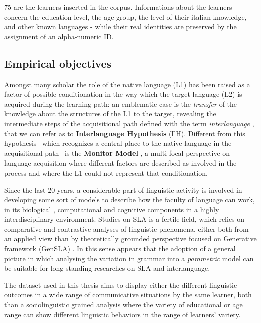 \documentclass[a4paper,twoside,12pt,chapterprefix=false,bibliography=totocnumbered,listof=flat]{scrbook}
\begin{document}
75 are the learners inserted in the corpus. Informations about the
learners concern the education level, the age group, the level of their
italian knowledge, and other known languages - while their real
identities are preserved by the assignment of an alpha-numeric ID.

\subsection{Empirical objectives}\label{empirical-objectives}

Amongst many scholar the role of the native language (L1) has been
raised as a factor of possible conditionation in the way which the
target language (L2) is acquired during the learning path: an emblematic
case is the \emph{transfer} of the knowledge about the structures of the
L1 to the target, revealing the intermediate steps of the acquisitional
path defined with the term \emph{interlanguage} \citep{selinker1972},
that we can refer as to \textbf{Interlanguage Hypothesis} (IlH).
Different from this hypothesis --which recognizes a central place to the
native language in the acquisitional path-- is the \textbf{Monitor
Model} \citep{krashen1981}, a multi-focal perspective on language
acquisition where different factors are described as involved in the
process and where the L1 could not represent that conditionation.

Since the last 20 years, a considerable part of linguistic activity is
involved in developing some sort of models to describe how the faculty
of language can work, in its biological \citep{hcf2002}, computational
\citep{fodor2001} and cognitive components in a highly interdisciplinary
environment. Studies on SLA is a fertile field, which relies on
comparative and contrastive analyses of linguistic phenomena, either
both from an applied view \citep{ellis1994} than by theoretically
grounded perspective focused on Generative framework (GenSLA)
\citep{guasti2002, hawkins2001, rothmanslabakova2017, sorace2011}. In
this sense appears that the adoption of a general picture in which
analysing the variation in grammar into a \emph{parametric} model
\citep{chomsky1995} can be suitable for long-standing researches on SLA
and interlanguage.

The dataset used in this thesis aims to display either the different
linguistic outcomes in a wide range of communicative situations by the
same learner, both than a sociolinguistic grained analysis where the
variety of educational or age range can show different linguistic
behaviors in the range of learners' variety.
\end{document}
